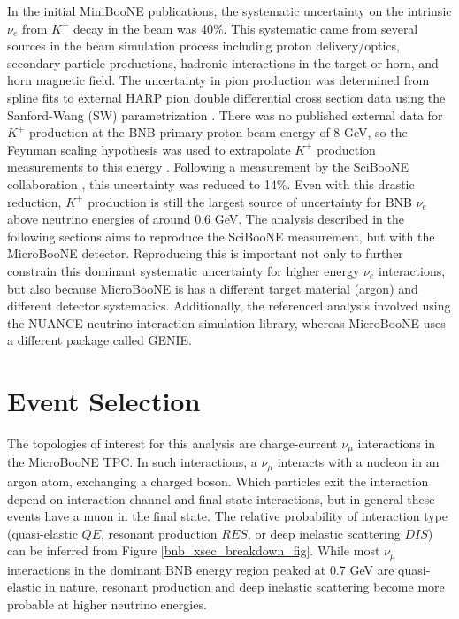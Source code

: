 In the initial MiniBooNE publications, the systematic uncertainty on the intrinsic $\nu_e$ from $K^+$ decay in the beam was 40\%. This systematic came from several sources in the beam simulation process including proton delivery/optics, secondary particle productions, hadronic interactions in the target or horn, and horn magnetic field. The uncertainty in pion production was determined from spline fits to external HARP pion double differential cross section data using the Sanford-Wang (SW) parametrization \cite{SanfordWangGary7} \cite{HARPgary8}. There was no published external data for $K^+$ production at the BNB primary proton beam energy of 8 GeV, so the Feynman scaling hypothesis was used to extrapolate $K^+$ production measurements to this energy \cite{FEYNMANgary6}. Following a measurement by the SciBooNE collaboration \cite{gary_kaon_production_paper}, this uncertainty was reduced to 14\%. Even with this drastic reduction, $K^+$ production is still the largest source of uncertainty for BNB $\nu_e$ above neutrino energies of around 0.6 GeV. The analysis described in the following sections aims to reproduce the SciBooNE measurement, but with the MicroBooNE detector. Reproducing this is important not only to further constrain this dominant systematic uncertainty for higher energy $\nu_e$ interactions, but also because MicroBooNE is has a different target material (argon) and different detector systematics. Additionally, the referenced analysis involved using the NUANCE neutrino interaction simulation library, whereas MicroBooNE uses a different package called GENIE.



\section{Event Selection}
The topologies of interest for this analysis are charge-current $\nu_\mu$ interactions in the MicroBooNE TPC. In such interactions, a $\nu_\mu$ interacts with a nucleon in an argon atom, exchanging a charged boson. Which particles exit the interaction depend on interaction channel and final state interactions, but in general these events have a muon in the final state. The relative probability of interaction type (quasi-elastic $QE$, resonant production $RES$, or deep inelastic scattering $DIS$) can be inferred from Figure \ref{bnb_xsec_breakdown_fig}. While most $\nu_\mu$ interactions in the dominant BNB energy region peaked at 0.7 GeV are quasi-elastic in nature, resonant production and deep inelastic scattering become more probable at higher neutrino energies.\\

